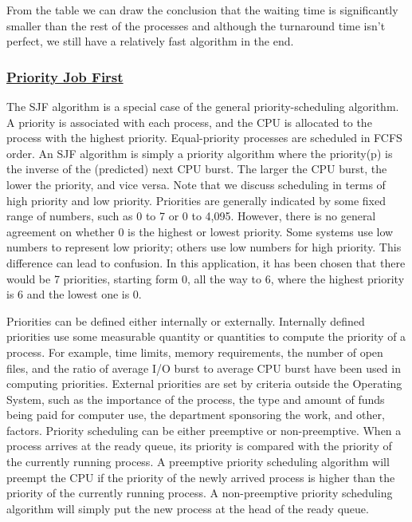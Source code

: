 \documentclass{article}
\begin{document}
From the table we can draw the conclusion that the waiting time is significantly smaller than the rest of the processes and although the turnaround time isn't perfect, we still have a relatively fast algorithm in the end.

\subsubsection{\underline{Priority Job First}}

The SJF algorithm is a special case of the general priority-scheduling algorithm. A priority is associated with each process, and the CPU is allocated to the process with the highest priority. Equal-priority processes are scheduled in FCFS order. An SJF algorithm is simply a priority algorithm where the priority(p) is the inverse of the (predicted) next CPU burst. The larger the CPU burst, the lower the priority, and vice versa. Note that we discuss scheduling in terms of high priority and low priority. Priorities are generally indicated by some fixed range of numbers, such as 0 to 7 or 0 to 4,095. However, there is no general agreement on whether 0 is the highest or lowest priority. Some systems use low numbers to represent low priority; others use low numbers for high priority. This difference can lead to confusion. In this application, it has been chosen that there would be 7 priorities, starting form 0, all the way to 6, where the highest priority is 6 and the lowest one is 0.

Priorities can be defined either internally or externally. Internally defined priorities use some measurable quantity or quantities to compute the priority of a process. For example, time limits, memory requirements, the number of open files, and the ratio of average I/O burst to average CPU burst have been used in computing priorities. External priorities are set by criteria outside the Operating System, such as the importance of the process, the type and amount of funds being paid for computer use, the department sponsoring the work, and other, factors. Priority scheduling can be either preemptive or non-preemptive. When a process arrives at the ready queue, its priority is compared with the priority of the currently running process. A preemptive priority scheduling algorithm will preempt the CPU if the priority of the newly arrived process is higher than the priority of the currently running process. A non-preemptive priority scheduling algorithm will simply put the new process at the head of the ready queue.
\end{document}
